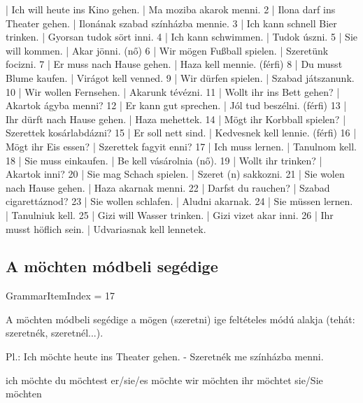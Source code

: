 \documentclass{article}
\newenvironment{desc}{\verbatim}{\endverbatim}
\newenvironment{exmp}{\verbatim}{\endverbatim}
\begin{document}
\begin{exmp}
1 | Ich will heute ins Kino gehen. | Ma moziba akarok menni.
2 | Ilona darf ins Theater gehen. | Ilonának szabad színházba mennie.
3 | Ich kann schnell Bier trinken. | Gyorsan tudok sört inni.
4 | Ich kann schwimmen. | Tudok úszni.
5 | Sie will kommen. | Akar jönni. (nő)
6 | Wir mögen Fußball spielen. | Szeretünk focizni.
7 | Er muss nach Hause gehen. | Haza kell mennie. (férfi)
8 | Du musst Blume kaufen. | Virágot kell venned.
9 | Wir dürfen spielen. | Szabad játszanunk.
10 | Wir wollen Fernsehen. | Akarunk tévézni.
11 | Wollt ihr ins Bett gehen? | Akartok ágyba menni?
12 | Er kann gut sprechen. | Jól tud beszélni. (férfi)
13 | Ihr dürft nach Hause gehen. | Haza mehettek.
14 | Mögt ihr Korbball spielen? | Szerettek kosárlabdázni?
15 | Er soll nett sind. | Kedvesnek kell lennie. (férfi)
16 | Mögt ihr Eis essen? | Szerettek fagyit enni?
17 | Ich muss lernen. | Tanulnom kell.
18 | Sie muss einkaufen. | Be kell vásárolnia (nő).
19 | Wollt ihr trinken? | Akartok inni?
20 | Sie mag Schach spielen. | Szeret (n) sakkozni.
21 | Sie wolen nach Hause gehen. | Haza akarnak menni.
22 | Darfst du rauchen? | Szabad cigarettáznod?
23 | Sie wollen schlafen. | Aludni akarnak.
24 | Sie müssen lernen. | Tanulniuk kell.
25 | Gizi will Wasser trinken. | Gizi vizet akar inni.
26 | Ihr musst höflich sein. | Udvariasnak kell lennetek.
\end{exmp}

\subsection{A möchten módbeli segédige}

GrammarItemIndex = 17

\begin{desc}
A möchten módbeli segédige a mögen (szeretni) ige feltételes módú
alakja (tehát: szeretnék, szeretnél...).

Pl.: Ich möchte heute ins Theater gehen. - Szeretnék me színházba menni.

ich möchte 
du möchtest 
er/sie/es möchte 
wir möchten 
ihr möchtet 
sie/Sie möchten
\end{desc}
\end{document}
